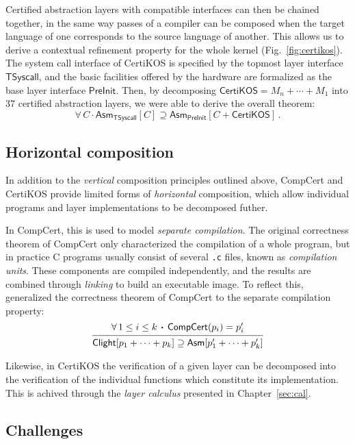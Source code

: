 \documentclass[11pt,oneside,draft]{book}
\theoremstyle{definition}
\newcommand{\kw}[1]{\ensuremath{ \mathsf{#1} }}
\newcommand{\bdot}{\boldsymbol{\cdot}}
\begin{document}
Certified abstraction layers
with compatible interfaces can then be chained together,
in the same way passes of a compiler
can be composed when the target language of one
corresponds to the source language of another.
This allows us to derive a contextual refinement property
for the whole kernel (Fig.~\ref{fig:certikos}).
The system call interface of CertiKOS is specified
by the topmost layer interface $\kw{TSyscall}$,
and the basic facilities offered by the hardware
are formalized as the base layer interface $\kw{PreInit}$.
Then, by decomposing $\kw{CertiKOS} = M_n + \cdots + M_1$
into 37 certified abstraction layers,
we were able to derive the overall theorem:
\[
  \forall \, C \, \bdot \,
    \kw{Asm}_{\kw{TSyscall}}[C]
    \supseteq
    \kw{Asm}_{\kw{PreInit}}[C + \kw{CertiKOS}] \,.
\]


\subsection{Horizontal composition} %

In addition to
the \emph{vertical} composition principles outlined above,
CompCert and CertiKOS provide limited forms of
\emph{horizontal} composition,
which allow individual programs and layer implementations
to be decomposed futher.

In CompCert,
this is used to model \emph{separate compilation}.
The original correctness theorem of CompCert
only characterized the compilation of a whole program,
but in practice C programs usually consist of
several \texttt{.c} files, known as \emph{compilation units}.
These components are compiled independently,
and the results are combined through \emph{linking} to build
an executable image.
To reflect this,
\citet{sepcompcert} generalized the correctness theorem of CompCert
to the separate compilation property:
\[
  \begin{prooftree}
    \hypo{\forall \, 1 \le i \le k \, \bdot \,
      \kw{CompCert}(p_i) = p_i'}
    \infer1{\kw{Clight}[p_1 + \cdots + p_k] \supseteq
      \kw{Asm}[p_1' + \cdots + p_k']}
  \end{prooftree}
\]

Likewise,
in CertiKOS the verification of a given layer
can be decomposed into
the verification of the individual functions
which constitute its implementation.
This is achived through the \emph{layer calculus}
presented in Chapter~\ref{sec:cal}.


\subsection{Challenges} %
\end{document}
